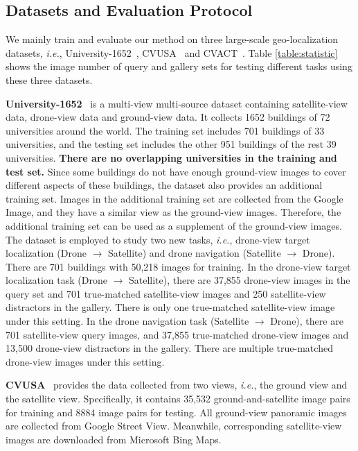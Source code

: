 \documentclass[journal]{IEEEtran}
\def\ie{\emph{i.e.}}
\begin{document}
\subsection{Datasets and Evaluation Protocol}
We mainly train and evaluate our method on three large-scale geo-localization datasets, \ie, University-1652~\cite{zheng_university-1652_nodate}, CVUSA~\cite{zhai_predicting_2017} and CVACT~\cite{liu_lending_2019}. Table \ref{table:statistic} shows the image number of query and gallery sets for testing different tasks using these three datasets.
\par
\textbf{University-1652}~\cite{zheng_university-1652_nodate} is a multi-view multi-source dataset containing satellite-view data, drone-view data and ground-view data. 
It collects 1652 buildings of 72 universities around the world. The training set includes 701 buildings of 33 universities, and the testing set includes the other 951 buildings of the rest 39 universities. \textbf{There are no overlapping universities in the training and test set.} Since some buildings do not have enough ground-view images to cover different aspects of these buildings, the dataset also provides an additional training set. Images in the additional training set are collected from the Google Image, and they have a similar view as the ground-view images. Therefore, the additional training set can be used as a supplement of the ground-view images. 
The dataset is employed to study two new tasks, \ie{}, drone-view target localization (Drone $\rightarrow$ Satellite) and drone navigation (Satellite $\rightarrow$ Drone). There are 701 buildings with 50,218 images for training. 
In the drone-view target localization task (Drone $\rightarrow$ Satellite), there are 37,855 drone-view images in the query set and 701 true-matched satellite-view images and 250 satellite-view distractors in the gallery. There is only one true-matched satellite-view image under this setting. In the drone navigation task (Satellite $\rightarrow$ Drone), there are 701 satellite-view query images, and 37,855 true-matched drone-view images and 13,500 drone-view distractors in the gallery. There are multiple true-matched drone-view images under this setting.
\par
\textbf{CVUSA}~\cite{zhai_predicting_2017} provides the data collected from two views, \ie, the ground view and the satellite view. Specifically, it contains 35,532 ground-and-satellite image pairs for training and 8884 image pairs for testing. All ground-view panoramic images are collected from Google Street View. Meanwhile, corresponding satellite-view images are downloaded from Microsoft Bing Maps. \par
\end{document}
